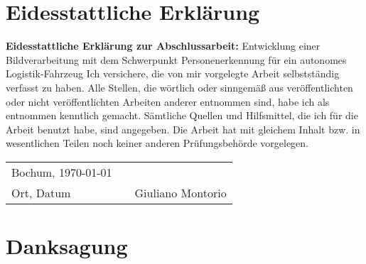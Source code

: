 \documentclass[12pt,a4paper,oneside,numbers=noenddot,headsepline,captions=tableheading,toc=bibliography,openany,tikz,margin=5mm]{scrbook}
\begin{document}
	\onehalfspacing
	\cleardoublepage
	\cleardoublepage
	
	
	
	\chapter*{\textbf{Eidesstattliche Erklärung}}
	\textbf{Eidesstattliche Erklärung zur Abschlussarbeit:}
	\newline
	\newline
	\newline
	\flqq Entwicklung einer Bildverarbeitung mit dem Schwerpunkt Personenerkennung für ein autonomes Logistik-Fahrzeug\frqq
	\newline
	\newline
	\newline
	Ich versichere, die von mir vorgelegte Arbeit selbstständig verfasst zu haben. Alle
	Stellen, die wörtlich oder sinngemäß aus veröffentlichten oder nicht veröffentlichten
	Arbeiten anderer entnommen sind, habe ich als entnommen kenntlich gemacht.
	Sämtliche Quellen und Hilfsmittel, die ich für die Arbeit benutzt habe, sind angegeben.
	Die Arbeit hat mit gleichem Inhalt bzw. in wesentlichen Teilen noch keiner anderen
	Prüfungsbehörde vorgelegen.
	\newline
	\newline
	\newline
	\newline
	\newline
	\newline
	\newline
	\newline
	\begin{center}
		\begin{tabular}[h]{lp{2cm}p{5.5cm}}
			Bochum, \today & & \\
			\cline{1-1}\cline{3-3}
			Ort, Datum& & Giuliano Montorio\\
		\end{tabular}
	\end{center}
	
	
	\chapter*{\textbf{Danksagung}}
	
	
	
\end{document}
